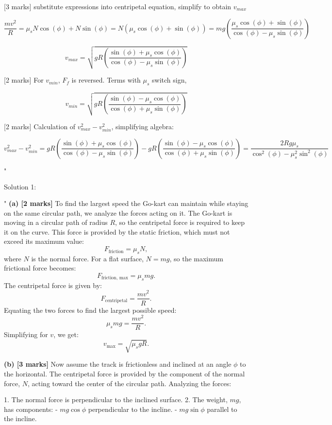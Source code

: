 [3 marks] substitute expressions into centripetal equation, simplify to obtain \( v_{max} \)

\[ \frac{m v^2}{R} = \mu_s N \cos(\phi) + N \sin(\phi) = N (\mu_s \cos(\phi) + \sin(\phi) ) = mg \left ( \frac{\mu_s \cos(\phi) + \sin(\phi)}{ \cos(\phi) - \mu_s \sin(\phi)} \right ) \]

\[ v_{max} = \sqrt{gR \left ( \frac{\sin(\phi) + \mu_s \cos(\phi)}{\cos(\phi) - \mu_s \sin(\phi)} \right )}  \]

[2 marks] For \( v_{min} \), \(F_f\) is reversed. Terms with \( \mu_s \) switch sign, 

\[ v_{min} = \sqrt{gR \left ( \frac{\sin(\phi) - \mu_s \cos(\phi)}{\cos(\phi) + \mu_s \sin(\phi)} \right )} \]

[2 marks] Calculation of \( v_{max}^{2} - v_{min}^{2} \), simplifying algebra:

\[ v_{max}^{2} - v_{min}^{2} = gR \left ( \frac{\sin(\phi) + \mu_s \cos(\phi)}{\cos(\phi) - \mu_s \sin(\phi)} \right ) - gR \left ( \frac{\sin(\phi) - \mu_s \cos(\phi)}{\cos(\phi) + \mu_s \sin(\phi)} \right ) = \frac{2Rg\mu_{s}}{\cos^{2}(\phi) - \mu_{s}^{2}\sin^{2}(\phi)} \]

"

Solution 1: 

"
\textbf{(a) [2 marks]}  
To find the largest speed the Go-kart can maintain while staying on the same circular path, we analyze the forces acting on it. The Go-kart is moving in a circular path of radius $R$, so the centripetal force is required to keep it on the curve. This force is provided by the static friction, which must not exceed its maximum value:
\[
F_{\text{friction}} = \mu_s N,
\]
where $N$ is the normal force. For a flat surface, $N = mg$, so the maximum frictional force becomes:
\[
F_{\text{friction, max}} = \mu_s mg.
\]
The centripetal force is given by:
\[
F_{\text{centripetal}} = \frac{mv^2}{R}.
\]
Equating the two forces to find the largest possible speed:
\[
\mu_s mg = \frac{mv^2}{R}.
\]
Simplifying for $v$, we get:
\[
v_{\text{max}} = \sqrt{\mu_s g R}.
\]

\textbf{(b) [3 marks]}  
Now assume the track is frictionless and inclined at an angle $\phi$ to the horizontal. The centripetal force is provided by the component of the normal force, $N$, acting toward the center of the circular path. Analyzing the forces:

1. The normal force is perpendicular to the inclined surface.
2. The weight, $mg$, has components:
   - $mg \cos\phi$ perpendicular to the incline.
   - $mg \sin\phi$ parallel to the incline.

